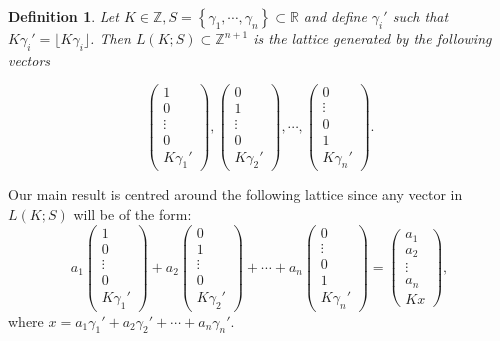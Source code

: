 \documentclass{article}
\newtheorem{defn}{Definition}
\numberwithin{equation}{section}
\begin{document}
\begin{defn}\label{LKGamma}
 Let $K \in \mathbb{Z}, S=\left\{\gamma_1,\cdots,\gamma_n\right\} \subset \mathbb{R}$ and define $\gamma_i'$ such that $K\gamma_i'=\lfloor K\gamma_i\rfloor$. Then $L(K;S) \subset \mathbb{Z}^{n+1}$ is the lattice generated by the following vectors

$$\left(\begin{array}{c}1\\ 0 \\ \vdots \\ 0 \\ K\gamma_1'\end{array}\right),
\left(\begin{array}{c}0\\ 1 \\ \vdots \\ 0 \\ K\gamma_2'\end{array}\right),
\cdots ,
\left(\begin{array}{c}0\\ \vdots \\ 0 \\ 1 \\ K\gamma_n'\end{array}\right).$$

\end{defn}

Our main result is centred around the following lattice since any vector in $L(K;S)$ will be of the form:
$$a_1\left(\begin{array}{c}1\\ 0 \\ \vdots \\ 0 \\ K\gamma_1'\end{array}\right)
+a_2\left(\begin{array}{c}0\\ 1 \\ \vdots \\ 0 \\ K\gamma_2'\end{array}\right)
+\cdots
+a_n\left(\begin{array}{c}0\\ \vdots \\ 0 \\ 1 \\ K\gamma_n'\end{array}\right)
= \left(\begin{array}{c}a_1\\ a_2 \\ \vdots \\ a_n \\ Kx\end{array}\right),$$ where $x = a_1\gamma_1'+a_2\gamma_2'+\cdots+a_n\gamma_n'$.
\end{document}
